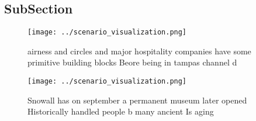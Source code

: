 \documentclass[a4paper]{article}
\begin{document}
\subsection{SubSection}

\begin{figure}
\centering
\texttt{[image: ../scenario\_visualization.png]}
\caption{airness and circles and major hospitality companies have some primitive building blocks Beore being in tampas channel d
}
\end{figure}
 
\begin{figure}
\centering
\texttt{[image: ../scenario\_visualization.png]}
\caption{Snowall has on september a permanent museum later opened Historically handled people b many ancient Is aging 
}
\end{figure}
 
\end{document}
